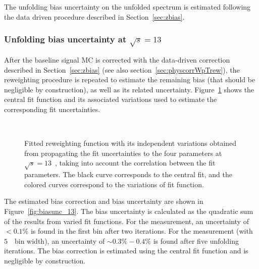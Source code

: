 \label{ss:ZpT_bias_rew}


The unfolding bias uncertainty on the unfolded \ptz spectrum is estimated following the data driven procedure described in Section~\ref{sec:zbias}.
\subsubsection{Unfolding bias uncertainty at $\sqrt{s} = 13$~\TeV }
After the baseline \POWHEG signal MC is corrected with the data-driven correction described in Section~\ref{sec:zbias} (see also section~\ref{sec:physcorrWpTrew}), the reweighting procedure is repeated to estimate the remaining bias (that should be negligible by construction), as well as its related uncertainty.
Figure~\ref{fig:fits_13_1GeV} shows the central fit function and its associated variations used to estimate the corresponding fit uncertainties.

\begin{figure}[h]
\centering
{}
\\
\caption{Fitted reweighting function with its independent variations obtained from propagating the fit uncertainties to the four parameters at $\sqrt{s} = 13$~\TeV, taking into account the correlation between the fit parameters. The black curve corresponds to the central fit, and the colored curves correspond to the variations of fit function. }
\label{fig:fits_13_1GeV}
\end{figure}

The estimated bias correction and bias uncertainty are shown in Figure~\ref{fig:biasunc_13}. The bias uncertainty is calculated as the quadratic sum of the results from varied fit functions.
For the \ptdilep measurement, an uncertainty of $<0.1\%$ is found in the first bin after two iterations. For the \ut measurement (with $5$~\GeV\ bin width), an uncertainty of $\sim 0.3\% -0.4\%$  is found after five unfolding iterations.
The bias correction is estimated using the central fit function and is negligible by construction.

